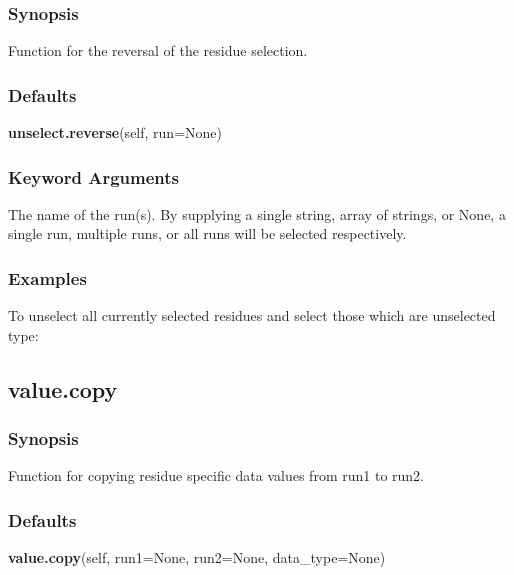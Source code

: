 \subsubsection{Synopsis}

Function for the reversal of the residue selection.



\subsubsection{Defaults}

\textsf{\textbf{unselect.reverse}(self, run=None)}


\subsubsection{Keyword Arguments}

  The name of the run(s).  By supplying a single string, array of strings, or None, a single run, multiple runs, or all runs will be selected respectively. 




\subsubsection{Examples}

To unselect all currently selected residues and select those which are unselected type:





\newpage

\subsection{value.copy}


\subsubsection{Synopsis}

Function for copying residue specific data values from run1 to run2.



\subsubsection{Defaults}

\textsf{\textbf{value.copy}(self, run1=None, run2=None, data\_type=None)}


